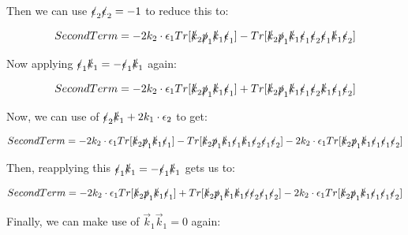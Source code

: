 \documentclass[a4]{article}
\begin{document}
    Then we can use $\slashed{\epsilon}_2 \slashed{\epsilon}_2 = - 1$ to reduce this to:

    \begin{equation}
        Second Term = - 2 k_2 \cdot \epsilon_1 Tr [\slashed{k}_2 \slashed{p}_1 \slashed{k}_1 \slashed{\epsilon}_1] - Tr [\slashed{k}_2 \slashed{p}_1 \slashed{k}_1 \slashed{\epsilon}_1 \slashed{\epsilon}_2 \slashed{\epsilon}_1 \slashed{k}_1 \slashed{\epsilon}_2]
    \end{equation}

    Now applying $\slashed{\epsilon}_1 \slashed{k}_1 = - \slashed{\epsilon}_1 \slashed{k}_1$ again:

    \begin{equation}
        Second Term = - 2 k_2 \cdot \epsilon_1 Tr [\slashed{k}_2 \slashed{p}_1 \slashed{k}_1 \slashed{\epsilon}_1] + Tr [\slashed{k}_2 \slashed{p}_1 \slashed{k}_1 \slashed{\epsilon}_1 \slashed{\epsilon}_2 \slashed{k}_1 \slashed{\epsilon}_1 \slashed{\epsilon}_2]
    \end{equation}

    Now, we can use of $\slashed{\epsilon}_2 \slashed{k}_1 + 2 k_1 \cdot \epsilon_2$ to get:

    \begin{equation}
        Second Term = - 2 k_2 \cdot \epsilon_1 Tr [\slashed{k}_2 \slashed{p}_1 \slashed{k}_1 \slashed{\epsilon}_1] - Tr [\slashed{k}_2 \slashed{p}_1 \slashed{k}_1 \slashed{\epsilon}_1 \slashed{k}_1 \slashed{\epsilon}_2 \slashed{\epsilon}_1 \slashed{\epsilon}_2] - 2 k_2 \cdot \epsilon_1 Tr [\slashed{k}_2 \slashed{p}_1 \slashed{k}_1 \slashed{\epsilon}_1 \slashed{\epsilon}_1 \slashed{\epsilon}_2]
    \end{equation}

    Then, reapplying this $\slashed{\epsilon}_1 \slashed{k}_1 = - \slashed{\epsilon}_1 \slashed{k}_1$ gets us to:

    \begin{equation}
        Second Term = - 2 k_2 \cdot \epsilon_1 Tr [\slashed{k}_2 \slashed{p}_1 \slashed{k}_1 \slashed{\epsilon}_1] + Tr [\slashed{k}_2 \slashed{p}_1 \slashed{k}_1 \slashed{k}_1 \slashed{\epsilon} \slashed{\epsilon}_2 \slashed{\epsilon}_1 \slashed{\epsilon}_2] - 2 k_2 \cdot \epsilon_1 Tr [\slashed{k}_2 \slashed{p}_1 \slashed{k}_1 \slashed{\epsilon}_1 \slashed{\epsilon}_1 \slashed{\epsilon}_2]
    \end{equation}

    Finally, we can make use of $\vec{k}_1 \vec{k}_1 = 0$ again:
\end{document}
